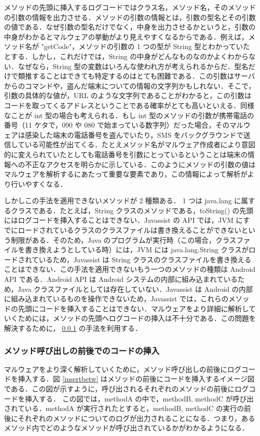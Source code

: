 メソッドの先頭に挿入するログコードではクラス名，メソッド名，そのメソッドの引数の情報を出力させる．メソッドの引数の情報とは，引数の型名とその引数の値である．なぜ引数の型名だけでなく，中身を出力させるかというと，引数の中身がわかるとマルウェアの挙動がより見えやすくなるからである．例えば，メソッド名が "getCode"，メソッドの引数の 1 つの型が String 型とわかっていたとする．しかし，これだけでは，String の中身がどんなものなのかよくわからない．なぜなら，String 型の変数はいろんな使われ方が考えられるからだ．型名だけで類推することはできても特定するのはとても困難である．この引数はサーバからのコマンドや，盗んだ端末についての情報の文字列かもしれない．そこで，引数の具体的な値が，URL のような文字列であることがわかると，この引数はコードを取ってくるアドレスということである確率がとても高いといえる．同様なことが int 型の場合も考えられる．もし int 型のメソッドの引数が携帯電話の番号（11 ケタで，090 や 080 で始まっている数字列）だった場合，そのマルウェアは感染した端末の電話番号を盗んでいたり，SMS をバックグラウンドで送信している可能性が出てくる．たとえメソッド名がマルウェア作成者により意図的に変えられていたとしても電話番号を引数にとっているということは端末の情報への不正なアクセスを明らかに示している．このようにメソッドの引数の値はマルウェアを解析するにあたって重要な要素であり，この情報によって解析がより行いやすくなる．

しかしこの手法を適用できないメソッドが 2 種類ある．
1 つは java.lang に属するクラスである．たとえば，String クラスのメソッドである，toString() の先頭にはログコードを挿入することはできない．Javassist の API では，JVM にすでにロードされているクラスのクラスファイルは書き換えることができないという制限がある．そのため，Java のプログラムが実行時（この場合，クラスファイルを書き換えようとしている時）には，JVM には java.lang.String クラスがロードされているため，Javassist は String  クラスのクラスファイルを書き換えることはできない．この手法を適用できないもう一つのメソッドの種類は Android API である．Android API は Android システムの内部に組み込まれているため，Java クラスファイルとしては存在していない．Javassist は Android の内部に組み込まれているものを操作できないため，Javassist では，これらのメソッドの先頭にコードを挿入することはできない．マルウェアをより詳細に解析していくためには，メソッドの先頭へログコードの挿入は不十分である．この問題を解決するために， \ref{methodcalls} の手法を利用する．

\subsubsection{メソッド呼び出しの前後でのコードの挿入}
\label{methodcalls}
マルウェアをより深く解析していくために，メソッド呼び出しの前後にログコードを挿入する．図 \ref{insertbetw} はメソッドの前後にコードを挿入するイメージ図である．この図が示すように，呼び出されるそれぞれのメソッドの前後にログコードを挿入する．
この図では，methodA の中で，methodB, methodC が呼び出されている．methodA が実行されたとすると，methodB, methodC の実行の前後にそれぞれのメソッドについてのログが出力されることになる．つまり，あるメソッド内でどのようなメソッドが呼び出されているかがわかるようになる．

